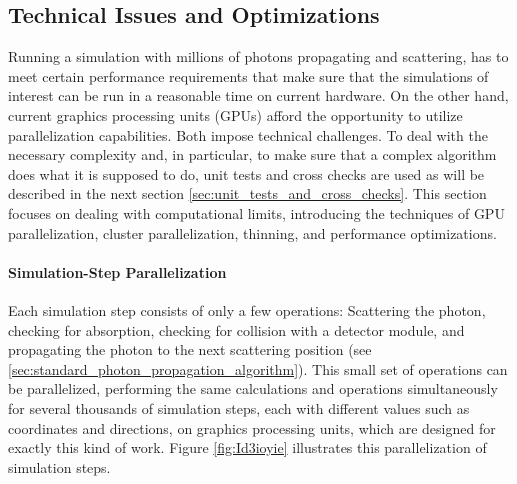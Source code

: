 
\subsection{Technical Issues and Optimizations}
\label{sec:technical_issues_and_optimizations}

Running a simulation with millions of photons propagating and scattering, has to meet certain performance requirements that make sure that the simulations of interest can be run in a reasonable time on current hardware. On the other hand, current graphics processing units (GPUs) afford the opportunity to utilize parallelization capabilities. Both impose technical challenges.
To deal with the necessary complexity and, in particular, to make sure that a complex algorithm does what it is supposed to do, unit tests and cross checks are used as will be described in the next section \ref{sec:unit_tests_and_cross_checks}.
This section focuses on dealing with computational limits, introducing the techniques of GPU parallelization, cluster parallelization, thinning, and performance optimizations.


\paragraph{Simulation-Step Parallelization}
Each simulation step consists of only a few operations: Scattering the photon, checking for absorption, checking for collision with a detector module, and propagating the photon to the next scattering position (see \ref{sec:standard_photon_propagation_algorithm}). This small set of operations can be parallelized, performing the same calculations and operations simultaneously for several thousands of simulation steps, each with different values such as coordinates and directions, on graphics processing units, which are designed for exactly this kind of work. Figure \ref{fig:Id3ioyie} illustrates this parallelization of simulation steps.

